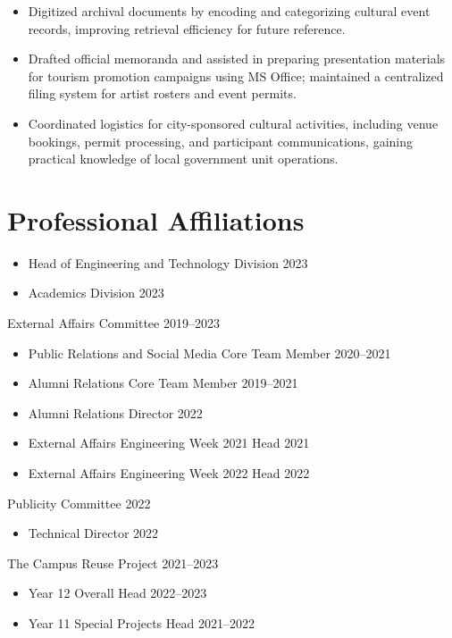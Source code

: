 \documentclass[10pt,a4paper]{article}
\begin{document}
\begin{itemize}
    \item Digitized archival documents by encoding and categorizing cultural event records, improving retrieval efficiency for future reference.
    \item Drafted official memoranda and assisted in preparing presentation materials for tourism promotion campaigns using MS Office; maintained a centralized filing system for artist rosters and event permits.
    \item Coordinated logistics for city-sponsored cultural activities, including venue bookings, permit processing, and participant communications, gaining practical knowledge of local government unit operations.
\end{itemize}

\section*{Professional Affiliations}

\begin{itemize}
    \item Head of Engineering and Technology Division \hfill 2023
\end{itemize}

\begin{itemize}
    \item Academics Division \hfill 2023
\end{itemize}

External Affairs Committee \hfill 2019--2023
\begin{itemize}
    \item Public Relations and Social Media Core Team Member \hfill 2020--2021
    \item Alumni Relations Core Team Member \hfill 2019--2021
    \item Alumni Relations Director \hfill 2022
    \item External Affairs Engineering Week 2021 Head \hfill 2021
    \item External Affairs Engineering Week 2022 Head \hfill 2022
\end{itemize}
Publicity Committee \hfill 2022
\begin{itemize}
    \item Technical Director \hfill 2022
\end{itemize}
The Campus Reuse Project \hfill 2021--2023
\begin{itemize}
    \item Year 12 Overall Head \hfill 2022--2023
    \item Year 11 Special Projects Head \hfill 2021--2022
\end{itemize}
\end{document}
